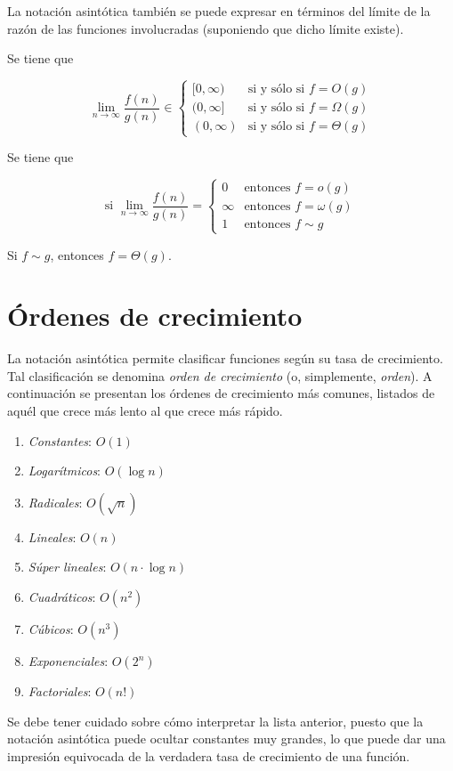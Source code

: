 La notación asintótica también se puede expresar en términos del límite
de la razón de las funciones involucradas (suponiendo que dicho límite
existe). 
\begin{prop}
Se tiene que

\[
\lim_{n\to\infty}\dfrac{f(n)}{g(n)}\in\begin{cases}
[0,\infty) & \text{si y sólo si }f=O(g)\\
(0,\infty] & \text{si y sólo si }f=\Omega(g)\\
(0,\infty) & \text{si y sólo si }f=\Theta(g)
\end{cases}
\]
\end{prop}
%
\begin{prop}
Se tiene que

\[
\text{si }\lim_{n\to\infty}\dfrac{f(n)}{g(n)}=\begin{cases}
0 & \text{entonces }f=o(g)\\
\infty & \text{entonces }f=\omega(g)\\
1 & \text{entonces }f\sim g
\end{cases}
\]
\end{prop}
%
\begin{prop}
Si $f\sim g$, entonces $f=\Theta(g)$.
\end{prop}

\section{Órdenes de crecimiento}

La notación asintótica permite clasificar funciones según su tasa
de crecimiento. Tal clasificación se denomina \emph{orden de crecimiento}
(o, simplemente, \emph{orden}). A continuación se presentan los órdenes
de crecimiento más comunes, listados de aquél que crece más lento
al que crece más rápido.
\begin{enumerate}
\item \emph{Constantes}: $O(1)$
\item \emph{Logarítmicos}: $O(\log n)$
\item \emph{Radicales}: $O(\sqrt{n})$
\item \emph{Lineales}: $O(n)$
\item \emph{Súper lineales}: $O(n\cdot\log n)$
\item \emph{Cuadráticos}: $O(n^{2})$
\item \emph{Cúbicos}: $O(n^{3})$
\item \emph{Exponenciales}: $O(2^{n})$
\item \emph{Factoriales}: $O(n!)$
\end{enumerate}
Se debe tener cuidado sobre cómo interpretar la lista anterior, puesto
que la notación asintótica puede ocultar constantes muy grandes, lo
que puede dar una impresión equivocada de la verdadera tasa de crecimiento
de una función.


